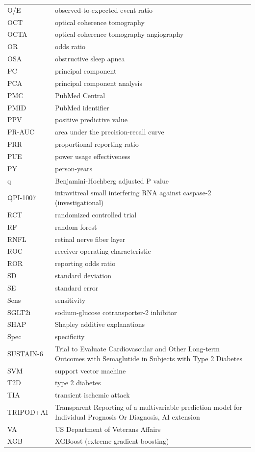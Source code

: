 \documentclass[
  11pt,
]{article}
\begin{document}
\begin{longtable}[]{@{}
  >{\raggedright\arraybackslash}p{}
  >{\raggedright\arraybackslash}p{}@{}}
O/E & observed-to-expected event ratio \\
OCT & optical coherence tomography \\
OCTA & optical coherence tomography angiography \\
OR & odds ratio \\
OSA & obstructive sleep apnea \\
PC & principal component \\
PCA & principal component analysis \\
PMC & PubMed Central \\
PMID & PubMed identifier \\
PPV & positive predictive value \\
PR-AUC & area under the precision-recall curve \\
PRR & proportional reporting ratio \\
PUE & power usage effectiveness \\
PY & person-years \\
q & Benjamini-Hochberg adjusted P value \\
QPI-1007 & intravitreal small interfering RNA against caspase-2
(investigational) \\
RCT & randomized controlled trial \\
RF & random forest \\
RNFL & retinal nerve fiber layer \\
ROC & receiver operating characteristic \\
ROR & reporting odds ratio \\
SD & standard deviation \\
SE & standard error \\
Sens & sensitivity \\
SGLT2i & sodium-glucose cotransporter-2 inhibitor \\
SHAP & Shapley additive explanations \\
Spec & specificity \\
SUSTAIN-6 & Trial to Evaluate Cardiovascular and Other Long-term
Outcomes with Semaglutide in Subjects with Type 2 Diabetes \\
SVM & support vector machine \\
T2D & type 2 diabetes \\
TIA & transient ischemic attack \\
TRIPOD+AI & Transparent Reporting of a multivariable prediction model
for Individual Prognosis Or Diagnosis, AI extension \\
VA & US Department of Veterans Affairs \\
XGB & XGBoost (extreme gradient boosting) \\
\end{longtable}
\end{document}
